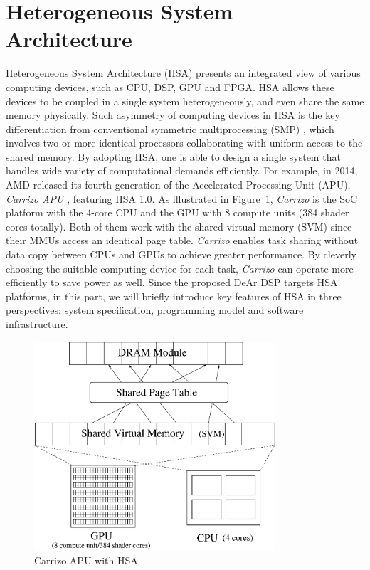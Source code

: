     \section{Heterogeneous System Architecture}
    Heterogeneous System Architecture (HSA) presents an integrated view of various computing devices, 
    such as CPU, DSP, GPU and FPGA.
    HSA allows these devices to be coupled in a single system heterogeneously, and even share the same memory physically.
    Such asymmetry of computing devices in HSA is the key differentiation from conventional symmetric multiprocessing (SMP) \cite{parallel},
    which involves two or more identical processors collaborating with uniform access to the shared memory.
    By adopting HSA, one is able to design a single system that handles wide variety of computational demands efficiently.
    For example, in 2014, AMD released its fourth generation of the Accelerated Processing Unit (APU), \textit{Carrizo APU} \cite{carrizo}, featuring HSA 1.0.
    As illustrated in Figure~\ref{fig:carrizo}, \textit{Carrizo} is the SoC platform with the 4-core CPU and the GPU with 8 compute units (384 shader cores totally).
    Both of them work with the shared virtual memory (SVM) since their MMUs access an identical page table.
    \textit{Carrizo} enables task sharing without data copy between CPUs and GPUs to achieve greater performance.
    By cleverly choosing the suitable computing device for each task, 
    \textit{Carrizo} can operate more efficiently to save power as well.
    Since the proposed DeAr DSP targets HSA platforms, 
    in this part, we will briefly introduce key features of HSA in three perspectives: 
    system specification, programming model and software infrastructure.
        \vspace{\textfig}
        \begin{figure}[!ht] 
            \centering
            \includegraphics[width=0.8\textwidth]{./figs/carrizo.eps}
            \caption{Carrizo APU with HSA}
            \label{fig:carrizo}
        \end{figure}
